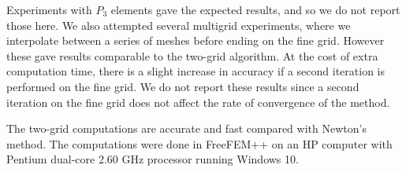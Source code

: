 \documentclass[12pt]{amsart}
\numberwithin{equation}{section}
\begin{document}

Experiments with $P_3$ elements gave the expected results, and so we do not report those here.
We also attempted several multigrid experiments, where we interpolate between a series of meshes before ending on the fine grid. However these gave results comparable to the two-grid algorithm. At the cost of extra computation time, there is a slight increase in accuracy if a second iteration is performed on the fine grid. We do not report these results since a second iteration on the fine grid does not affect the rate of convergence of the method. 

The two-grid computations are accurate and fast compared with Newton's method.
The computations were done in FreeFEM++ on an HP computer with Pentium dual-core 2.60 GHz processor running Windows 10. 
%
\end{document}
